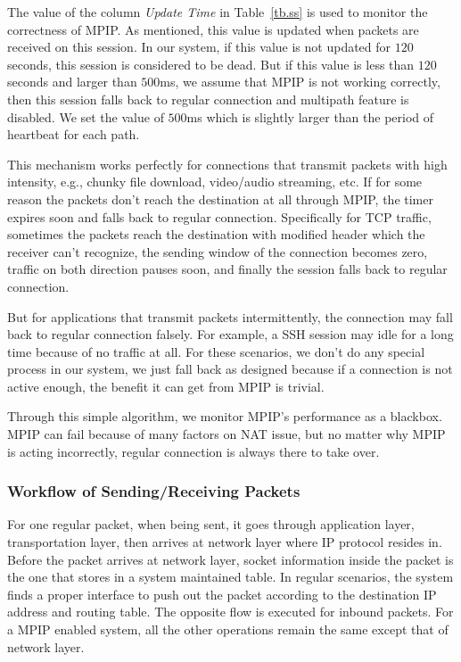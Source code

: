 The value of the column \emph{Update Time} in Table~\ref{tb.ss} is used to monitor the correctness of MPIP. As mentioned, this value is updated when packets are received on this session. In our system, if this value is not updated for $120$ seconds, this session is considered to be dead. But if this value is less than $120$ seconds and larger than $500$ms, we assume that MPIP is not working correctly, then this session falls back to regular connection and multipath feature is disabled. We set the value of $500$ms which is slightly larger than the period of heartbeat for each path.

This mechanism works perfectly for connections that transmit packets with high intensity, e.g., chunky file download, video/audio streaming, etc. If for some reason the packets don't reach the destination at all through MPIP, the timer expires soon and falls back to regular connection. Specifically for TCP traffic, sometimes the packets reach the destination with modified header which the receiver can't recognize, the sending window of the connection becomes zero, traffic on both direction pauses soon, and finally the session falls back to regular connection.

But for applications that transmit packets intermittently, the connection may fall back to regular connection falsely. For example, a SSH session may idle for a long time because of no traffic at all. For these scenarios, we don't do any special process in our system, we just fall back as designed because if a connection is not active enough, the benefit it can get from MPIP is trivial.

Through this simple algorithm, we monitor MPIP's performance as a blackbox. MPIP can fail because of many factors on NAT issue, but no matter why MPIP is acting incorrectly, regular connection is always there to take over.


\subsubsection{Workflow of Sending/Receiving Packets}

For one regular packet, when being sent, it goes through application layer, transportation layer, then arrives at network layer where IP protocol resides in. Before the packet arrives at network layer, socket information inside the packet is the one that stores in a system maintained table. In regular scenarios, the system finds a proper interface to push out the packet according to the destination IP address and routing table. The opposite flow is executed for inbound packets. For a MPIP enabled system, all the other operations remain the same except that of network layer.

